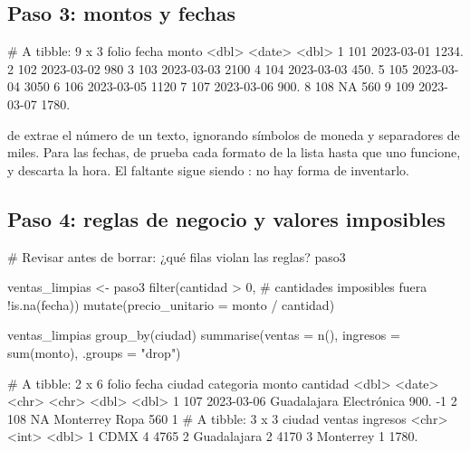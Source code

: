 \subsection{Paso 3: montos y fechas}

\begin{rsalida}
# A tibble: 9 x 3
  folio fecha      monto
  <dbl> <date>     <dbl>
1   101 2023-03-01 1234.
2   102 2023-03-02  980 
3   103 2023-03-03 2100 
4   104 2023-03-03  450.
5   105 2023-03-04 3050 
6   106 2023-03-05 1120 
7   107 2023-03-06  900.
8   108 NA          560 
9   109 2023-03-07 1780.
\end{rsalida}

 de  extrae el número de un texto,
ignorando símbolos de moneda y separadores de miles. Para las fechas,
 de  prueba cada formato de la
lista  hasta que uno funcione, y  descarta
la hora. El faltante sigue siendo : no hay forma de inventarlo.

\subsection{Paso 4: reglas de negocio y valores imposibles}

\begin{rcode}
# Revisar antes de borrar: ¿qué filas violan las reglas?
paso3 %

ventas_limpias <- paso3 %
  filter(cantidad > 0,              # cantidades imposibles fuera
         !is.na(fecha)) %
  mutate(precio_unitario = monto / cantidad)

ventas_limpias %
  group_by(ciudad) %
  summarise(ventas = n(), ingresos = sum(monto), .groups = "drop")
\end{rcode}
\begin{rsalida}
# A tibble: 2 x 6
  folio fecha      ciudad      categoria   monto cantidad
  <dbl> <date>     <chr>       <chr>       <dbl>    <dbl>
1   107 2023-03-06 Guadalajara Electrónica  900.       -1
2   108 NA         Monterrey   Ropa         560         1
# A tibble: 3 x 3
  ciudad      ventas ingresos
  <chr>        <int>    <dbl>
1 CDMX             4    4765 
2 Guadalajara      2    4170 
3 Monterrey        1    1780.
\end{rsalida}

